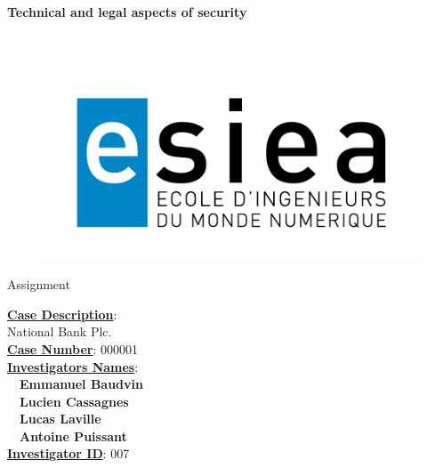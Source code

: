 \begin{titlepage}
      \begin{center}   
        \Huge
        \textbf{Technical and legal aspects of security}
        
        \LARGE
        ~
        
        
        \vfill
        \begin{figure}[H]
	    \centering
	    \begin{minipage}{0.9\textwidth}
		\centering
		\includegraphics[width=\textwidth]{./img/esiea.jpeg}
	    \end{minipage}\hfill
	\end{figure}
        \vfill
        
        \vspace{0.5cm}
        
        Assignment

        
        \vspace{2cm}
        \begin{minipage}{.8\textwidth}
          \underline{\textbf{Case Description}}: \\National Bank Plc.\\
          \underline{\textbf{Case Number}}: 000001\\
          \underline{\textbf{Investigators Names}}:\\~~\textbf{Emmanuel Baudvin}\\~~\textbf{Lucien Cassagnes}\\~~\textbf{Lucas Laville}\\~~\textbf{Antoine Puissant}\\
          \underline{\textbf{Investigator ID}}: 007\\
        \end{minipage}


\end{center}
\end{titlepage}
